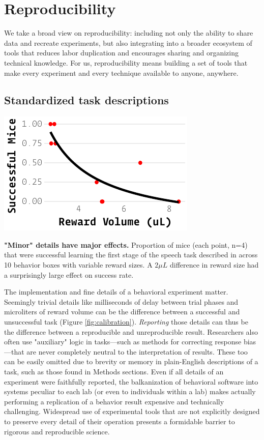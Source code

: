 \section{Reproducibility}
\label{sec:reproducibility}

We take a broad view on reproducibility: including not only the ability to share data and recreate experiments, but also integrating into a broader ecosystem of tools that reduces labor duplication and encourages sharing and organizing technical knowledge. For us, reproducibility means building a set of tools that make every experiment and every technique available to anyone, anywhere.

\subsection{Standardized task descriptions}

\begin{marginfigure}[-2cm]
\includegraphics[]{figures/calibration_warning.pdf}
\caption{\textbf{"Minor" details have major effects.} Proportion of mice (each point, n=4) that were successful learning the first stage of the speech task described in \citep{saundersMiceCanLearn2019} across 10 behavior boxes with variable reward sizes. A $2 \mu L$ difference in reward size had a surprisingly large effect on success rate.}
\label{fig:calibration}
\end{marginfigure}

The implementation and fine details of a behavioral experiment matter. Seemingly trivial details like milliseconds of delay between trial phases and microliters of reward volume can be the difference between a successful and unsuccessful task (Figure \ref{fig:calibration}). \textit{Reporting} those details can thus be the difference between a reproducible and unreproducible result.  Researchers also often use "auxiliary" logic in tasks---such as methods for correcting response bias---that are never completely neutral to the interpretation of results. These too can be easily omitted due to brevity or memory in plain-English descriptions of a task, such as those found in Methods sections. Even if all details of an experiment were faithfully reported, the balkanization of behavioral software into systems peculiar to each lab (or even to individuals within a lab) makes actually performing a replication of a behavior result expensive and technically challenging. Widespread use of experimental tools that are not explicitly designed to preserve every detail of their operation presents a formidable barrier to rigorous and reproducible science\citep{wallReliabilityStartsExperimental2019}.

